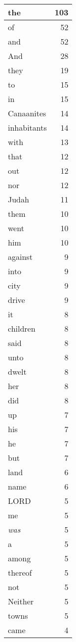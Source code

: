 \begin{center}
\begin{longtable}{l|r}
\hline \hline
\endlastfoot
the & 103 \\ \hline
of & 52 \\ \hline
and & 52 \\ \hline
And & 28 \\ \hline
they & 19 \\ \hline
to & 15 \\ \hline
in & 15 \\ \hline
Canaanites & 14 \\ \hline
inhabitants & 14 \\ \hline
with & 13 \\ \hline
that & 12 \\ \hline
out & 12 \\ \hline
nor & 12 \\ \hline
Judah & 11 \\ \hline
them & 10 \\ \hline
went & 10 \\ \hline
him & 10 \\ \hline
against & 9 \\ \hline
into & 9 \\ \hline
city & 9 \\ \hline
drive & 9 \\ \hline
it & 8 \\ \hline
children & 8 \\ \hline
said & 8 \\ \hline
unto & 8 \\ \hline
dwelt & 8 \\ \hline
her & 8 \\ \hline
did & 8 \\ \hline
up & 7 \\ \hline
his & 7 \\ \hline
he & 7 \\ \hline
but & 7 \\ \hline
land & 6 \\ \hline
name & 6 \\ \hline
LORD & 5 \\ \hline
me & 5 \\ \hline
\emph{was} & 5 \\ \hline
a & 5 \\ \hline
among & 5 \\ \hline
thereof & 5 \\ \hline
not & 5 \\ \hline
Neither & 5 \\ \hline
towns & 5 \\ \hline
came & 4 \\ \hline

\end{longtable}
\end{center}
